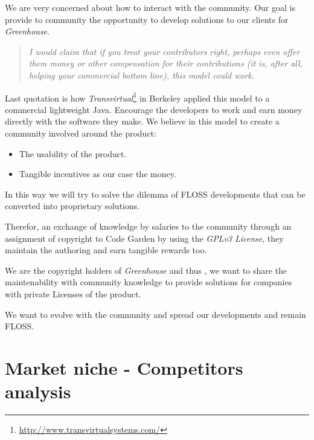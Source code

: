 \documentclass[11pt]{scrartcl}
\begin{document}
\par We are very concerned about how to interact with the community. Our goal is provide to community the opportunity to develop solutions to our clients for \emph{Greenhouse}.

\begin{quotation}
    \emph{I would claim that if you treat your contributors right, perhaps even offer them money or other compensation for their contributions (it is, after all, helping your commercial bottom line), this model could work.}
\end{quotation}

\par Last quotation is how \emph{Transvirtual}\footnote{\url{http://www.transvirtualsystems.com/}} in Berkeley applied this model to a commercial lightweight Java. Encourage the developers to work and earn money directly with the software they make. We believe in this model to create a community involved around the product: 

\begin{itemize}
	\item The usability of the product.
	\item Tangible incentives as our case the money.
\end{itemize}

\par In this way we will try to solve the dilemma of FLOSS developments that can be converted into proprietary solutions.

\par Therefor, an exchange of knowledge by salaries to the community through an assignment of copyright to Code Garden by using the \emph{GPLv3 License}, they maintain the authoring and earn tangible rewards too.

\par We are the copyright holders of \emph{Greenhouse} and thus , we want to share the maintenability with community knowledge to provide solutions for companies with private Licenses of the product.

\par We want to evolve with the community and spread our developments and remain FLOSS.

\section{Market niche - Competitors analysis}
\label{sec:market-niche}
\end{document}
